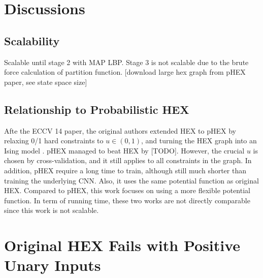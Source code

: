 \documentclass[11pt,a4paper]{article}
\begin{document}
\clearpage
\section{Discussions}
\subsection{Scalability}

Scalable until stage 2 with MAP LBP. Stage 3 is not scalable due to the brute force calculation of partition function. [download large hex graph from pHEX paper, see state space size]

\subsection{Relationship to Probabilistic HEX}

Afte the ECCV 14 paper, the original authors extended HEX to pHEX by relaxing 0/1 hard constraints to $u\in(0,1)$, and turning the HEX graph into an Ising model \cite{ding2015probabilistic}. pHEX managed to beat HEX by [TODO]. However, the crucial $u$ is chosen by cross-validation, and it still applies to all constraints in the graph. In addition, pHEX require a long time to train, although still much shorter than training the underlying CNN. Also, it uses the same potential function as original HEX. Compared to pHEX, this work focuses on using a more flexible potential function. In term of running time, these two works are not directly comparable since this work is not scalable.

\clearpage
\appendix
\section{Original HEX Fails with Positive Unary Inputs}
\label{sec:fail}
\end{document}
